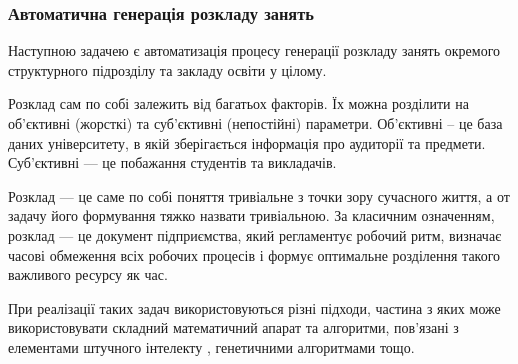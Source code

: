 \subsubsection{Автоматична генерація розкладу занять}

Наступною задачею є автоматизація процесу  генерації розкладу занять окремого структурного підрозділу та закладу освіти у цілому. 

Розклад сам по собі залежить від багатьох факторів. Їх можна розділити на об'єктивні (жорсткі) та суб'єктивні (непостійні) параметри. Об'єктивні -- це база даних університету, в якій зберігається інформація про аудиторії та предмети. Суб'єктивні — це побажання студентів та викладачів.

Розклад — це саме по собі поняття тривіальне з точки зору сучасного життя, а от задачу його формування тяжко назвати тривіальною. За класичним означенням, розклад — це документ підприємства, який регламентує робочий ритм, визначає часові обмеження всіх робочих процесів і формує оптимальне розділення такого важливого ресурсу як час.

При реалізації таких задач використовуються різні підходи, частина з яких може використовувати складний математичний апарат та алгоритми, пов'язані з елементами штучного інтелекту \cite{рубан2013аналіз}, генетичними алгоритмами \cite{мулява2016система} тощо.
